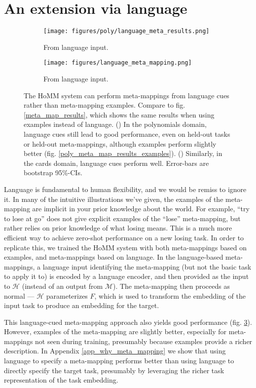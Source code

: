 \documentclass{article}
\begin{document}
\section{An extension via language}
\vspace{-0.5em} %
\begin{figure}
\centering
\begin{subfigure}{0.5\textwidth}
\texttt{[image: figures/poly/language\_meta\_results.png]}
\caption{From language input.}
\label{poly_meta_map_results_language}
\end{subfigure}%
\begin{subfigure}{0.5\textwidth}
\texttt{[image: figures/language\_meta\_mapping.png]}
\caption{From language input.}
\label{cards_meta_map_results_language}
\end{subfigure}
\caption{The HoMM system can perform meta-mappings from language cues rather than meta-mapping examples. Compare to fig. \ref{meta_map_results}, which shows the same results when using examples instead of language. () In the polynomials domain, language cues still lead to good performance, even on held-out tasks or held-out meta-mappings, although examples perform slightly better (fig. \ref{poly_meta_map_results_examples}). () Similarly, in the cards domain, language cues perform well. Error-bars are bootstrap 95\%-CIs.}
\label{language_meta_map_results}
\end{figure}
Language is fundamental to human flexibility, and we would be remiss to ignore it. In many of the intuitive illustrations we've given, the examples of the meta-mapping are implicit in your prior knowledge about the world. For example, ``try to lose at go'' does not give explicit examples of the ``lose'' meta-mapping, but rather relies on prior knowledge of what losing means. This is a much more efficient way to achieve zero-shot performance on a new losing task. In order to replicate this, we trained the HoMM system with both meta-mappings based on examples, and meta-mappings based on language. In the language-based meta-mappings, a language input identifying the meta-mapping (but not the basic task to apply it to) is encoded by a language encoder, and then provided as the input to $\mathcal{H}$ (instead of an output from $\mathcal{M}$). The meta-mapping then proceeds as normal --- $\mathcal{H}$ parameterizes $F$, which is used to transform the embedding of the input task to produce an embedding for the target. \par
This language-cued meta-mapping approach also yields good performance (fig. \ref{language_meta_map_results}). However, examples of the meta-mapping are slightly better, especially for meta-mappings not seen during training, presumably because examples provide a richer description. In Appendix \ref{app_why_meta_mapping} we show that using language to specify a meta-mapping performs better than using language to directly specify the target task, presumably by leveraging the richer task representation of the task embedding. \par
\end{document}
